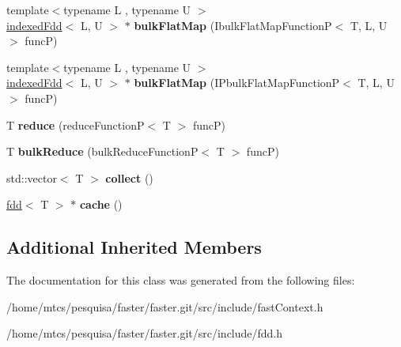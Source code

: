 \begin{DoxyCompactItemize}
\item 
\hypertarget{classfaster_1_1fdd_adfcb736f7161db476dbbb275f1d08659}{}{\footnotesize template$<$typename L , typename U $>$ }\\\hyperlink{classfaster_1_1indexedFdd}{indexed\+Fdd}$<$ L, U $>$ $\ast$ {\bfseries bulk\+Flat\+Map} (Ibulk\+Flat\+Map\+Function\+P$<$ T, L, U $>$ func\+P)\label{classfaster_1_1fdd_adfcb736f7161db476dbbb275f1d08659}

\item 
\hypertarget{classfaster_1_1fdd_af16d4811371f6dbcfbb717a73a182d48}{}{\footnotesize template$<$typename L , typename U $>$ }\\\hyperlink{classfaster_1_1indexedFdd}{indexed\+Fdd}$<$ L, U $>$ $\ast$ {\bfseries bulk\+Flat\+Map} (I\+Pbulk\+Flat\+Map\+Function\+P$<$ T, L, U $>$ func\+P)\label{classfaster_1_1fdd_af16d4811371f6dbcfbb717a73a182d48}

\item 
\hypertarget{classfaster_1_1fdd_a1e828ad9a768db382aef2adf878aa1b2}{}T {\bfseries reduce} (reduce\+Function\+P$<$ T $>$ func\+P)\label{classfaster_1_1fdd_a1e828ad9a768db382aef2adf878aa1b2}

\item 
\hypertarget{classfaster_1_1fdd_a8f133f23bd653329f44290ebda70bb9b}{}T {\bfseries bulk\+Reduce} (bulk\+Reduce\+Function\+P$<$ T $>$ func\+P)\label{classfaster_1_1fdd_a8f133f23bd653329f44290ebda70bb9b}

\item 
\hypertarget{classfaster_1_1fdd_a089aa4c91205948dacbc6e6bd6e5bcde}{}std\+::vector$<$ T $>$ {\bfseries collect} ()\label{classfaster_1_1fdd_a089aa4c91205948dacbc6e6bd6e5bcde}

\item 
\hypertarget{classfaster_1_1fdd_ac460ea12f02045a3d9203bb83eb5adb3}{}\hyperlink{classfaster_1_1fdd}{fdd}$<$ T $>$ $\ast$ {\bfseries cache} ()\label{classfaster_1_1fdd_ac460ea12f02045a3d9203bb83eb5adb3}

\end{DoxyCompactItemize}
\subsection*{Additional Inherited Members}


The documentation for this class was generated from the following files\+:\begin{DoxyCompactItemize}
\item 
/home/mtcs/pesquisa/faster/faster.\+git/src/include/fast\+Context.\+h\item 
/home/mtcs/pesquisa/faster/faster.\+git/src/include/fdd.\+h\end{DoxyCompactItemize}
